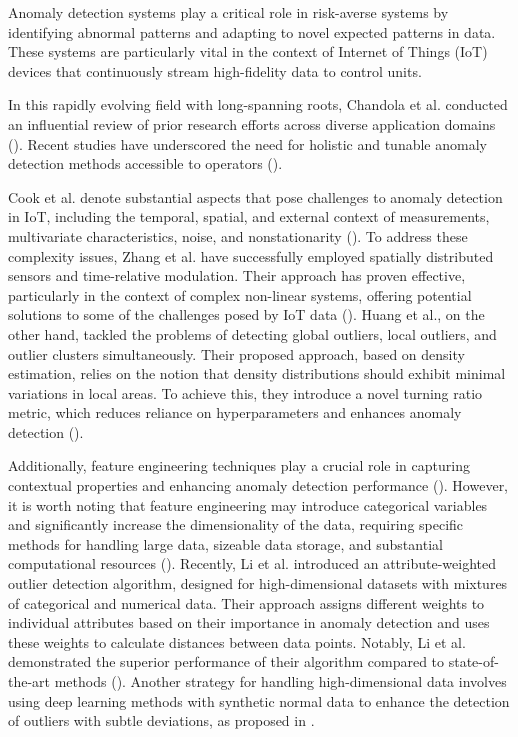 Anomaly detection systems play a critical role in risk-averse systems by identifying abnormal patterns and adapting to novel expected patterns in data. These systems are particularly vital in the context of Internet of Things (IoT) devices that continuously stream high-fidelity data to control units.

In this rapidly evolving field with long-spanning roots, Chandola et al. conducted an influential review of prior research efforts across diverse application domains (\cite{Chandola2009}).
Recent studies have underscored the need for holistic and tunable anomaly detection methods accessible to operators (\cite{Laptev2015, Kejariwal2015, Cook2020}).

Cook et al. denote substantial aspects that pose challenges to anomaly detection in IoT, including the temporal, spatial, and external context of measurements, multivariate characteristics, noise, and nonstationarity (\cite{Cook2020}). To address these complexity issues, Zhang et al. have successfully employed spatially distributed sensors and time-relative modulation. Their approach has proven effective, particularly in the context of complex non-linear systems, offering potential solutions to some of the challenges posed by IoT data (\cite{ZHANG2024121506}). Huang et al., on the other hand, tackled the problems of detecting global outliers, local outliers, and outlier clusters simultaneously. Their proposed approach, based on density estimation, relies on the notion that density distributions should exhibit minimal variations in local areas. To achieve this, they introduce a novel turning ratio metric, which reduces reliance on hyperparameters and enhances anomaly detection (\cite{HUANG2023120799}).

Additionally, feature engineering techniques play a crucial role in capturing contextual properties and enhancing anomaly detection performance (\cite{Fan2019}). However, it is worth noting that feature engineering may introduce categorical variables and significantly increase the dimensionality of the data, requiring specific methods for handling large data, sizeable data storage, and substantial computational resources (\cite{Talagala2021}). Recently, Li et al. introduced an attribute-weighted outlier detection algorithm, designed for high-dimensional datasets with mixtures of categorical and numerical data. Their approach assigns different weights to individual attributes based on their importance in anomaly detection and uses these weights to calculate distances between data points. Notably, Li et al. demonstrated the superior performance of their algorithm compared to state-of-the-art methods (\cite{LI2024121304}). Another strategy for handling high-dimensional data involves using deep learning methods with synthetic normal data to enhance the detection of outliers with subtle deviations, as proposed in \cite{DU2024121161}.

